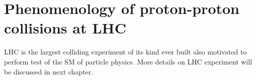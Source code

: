 \section{Phenomenology of proton-proton collisions at LHC} \label{phenomenology}
LHC is the largest colliding experiment of its kind ever built also motivated to perform test of the SM of particle physics.
More details on LHC experiment will be discussed in next chapter.


